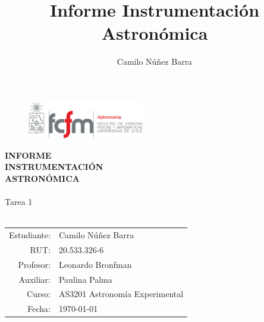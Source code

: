 \documentclass[letter, 11pt, twocolumn]{article}
\title{Informe Instrumentación Astronómica}
\author{Camilo Núñez Barra}
\numberwithin{equation}{section}
\begin{document}
\begin{figure}[H]
	\includegraphics[width=2in]{fcfm_das}
\end{figure}
\begin{center}
	\textbf{\huge{INFORME\\INSTRUMENTACIÓN\\ASTRONÓMICA}}\\\,\\Tarea 1\\\,
\end{center}
\begin{tabular}{rl}
	Estudiante:&Camilo Núñez Barra\\
	RUT:&20.533.326-6\\
	Profesor:&Leonardo Bronfman\\
	Auxiliar:&Paulina Palma\\
	Curso:&AS3201 Astronomía Experimental\\
	Fecha:&\today
\end{tabular}







\end{document}

